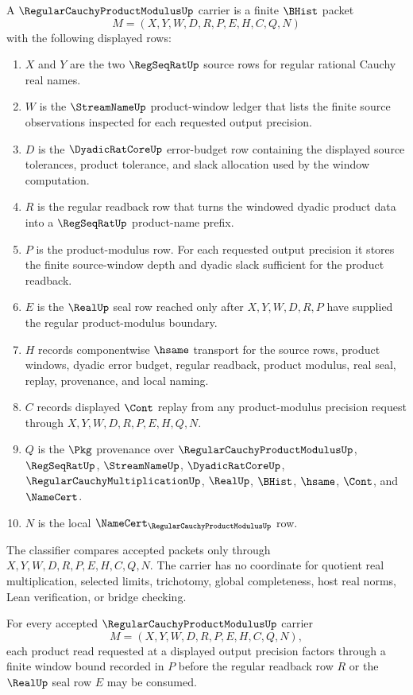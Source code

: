 \begin{definition}
\label{def:regular-cauchy-product-modulus-carrier}
A $\RegularCauchyProductModulusUp$ carrier is a finite $\BHist$ packet
$$
M=(X,Y,W,D,R,P,E,H,C,Q,N)
$$
with the following displayed rows:
\begin{enumerate}
\item $X$ and $Y$ are the two $\RegSeqRatUp$ source rows for regular rational Cauchy real names.
\item $W$ is the $\StreamNameUp$ product-window ledger that lists the finite source observations inspected for each requested output precision.
\item $D$ is the $\DyadicRatCoreUp$ error-budget row containing the displayed source tolerances, product tolerance, and slack allocation used by the window computation.
\item $R$ is the regular readback row that turns the windowed dyadic product data into a $\RegSeqRatUp$ product-name prefix.
\item $P$ is the product-modulus row. For each requested output precision it stores the finite source-window depth and dyadic slack sufficient for the product readback.
\item $E$ is the $\RealUp$ seal row reached only after $X,Y,W,D,R,P$ have supplied the regular product-modulus boundary.
\item $H$ records componentwise $\hsame$ transport for the source rows, product windows, dyadic error budget, regular readback, product modulus, real seal, replay, provenance, and local naming.
\item $C$ records displayed $\Cont$ replay from any product-modulus precision request through $X,Y,W,D,R,P,E,H,Q,N$.
\item $Q$ is the $\Pkg$ provenance over $\RegularCauchyProductModulusUp$, $\RegSeqRatUp$, $\StreamNameUp$, $\DyadicRatCoreUp$, $\RegularCauchyMultiplicationUp$, $\RealUp$, $\BHist$, $\hsame$, $\Cont$, and $\NameCert$.
\item $N$ is the local $\NameCert_{\RegularCauchyProductModulusUp}$ row.
\end{enumerate}
The classifier compares accepted packets only through $X,Y,W,D,R,P,E,H,C,Q,N$. The carrier has no coordinate for quotient real multiplication, selected limits, trichotomy, global completeness, host real norms, Lean verification, or bridge checking.
\end{definition}

\begin{theorem}
\label{thm:regular-cauchy-product-modulus-window-bound}
For every accepted $\RegularCauchyProductModulusUp$ carrier
$$
M=(X,Y,W,D,R,P,E,H,C,Q,N),
$$
each product read requested at a displayed output precision factors through a finite window bound recorded in $P$ before the regular readback row $R$ or the $\RealUp$ seal row $E$ may be consumed.
\end{theorem}


